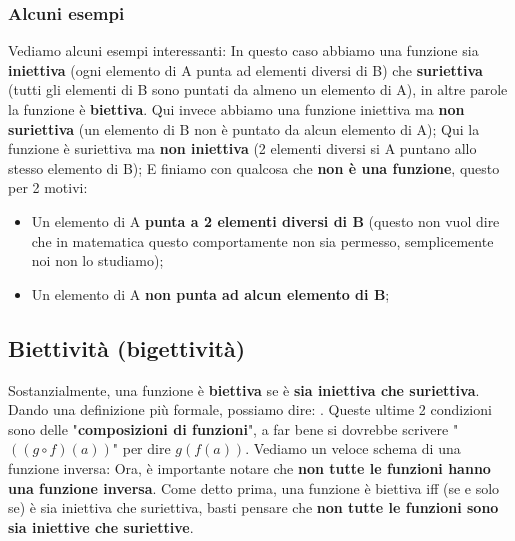 		\subsubsection{Alcuni esempi}
			Vediamo alcuni esempi interessanti:
			In questo caso abbiamo una funzione sia \textbf{iniettiva} (ogni elemento di A punta ad elementi diversi di B) che \textbf{suriettiva} (tutti gli elementi di B sono puntati da almeno un elemento di A), in altre parole la funzione è \textbf{biettiva}.
			Qui invece abbiamo una funzione iniettiva ma \textbf{non suriettiva} (un elemento di B non è puntato da alcun elemento di A);
			Qui la funzione è suriettiva ma \textbf{non iniettiva} (2 elementi diversi si A puntano allo stesso elemento di B);
			E finiamo con qualcosa che \textbf{non è una funzione}, questo per 2 motivi:
			\begin{itemize}
				\item Un elemento di A \textbf{punta a 2 elementi diversi di B} (questo non vuol dire che in matematica questo comportamente non sia permesso, semplicemente noi non lo studiamo);
				\item Un elemento di A \textbf{non punta ad alcun elemento di B};
			\end{itemize}
		
	\subsection{Biettività (bigettività)}
		Sostanzialmente, una funzione è \textbf{biettiva} se è \textbf{sia iniettiva che suriettiva}. Dando una definizione più formale, possiamo dire: . Queste ultime 2 condizioni sono delle "\textbf{composizioni di funzioni}", a far bene si dovrebbe scrivere "$((g \circ f)(a))$" per dire $g(f(a))$. Vediamo un veloce schema di una funzione inversa:		
		Ora, è importante notare che \textbf{non tutte le funzioni hanno una funzione inversa}. Come detto prima, una funzione è biettiva iff (se e solo se) è sia iniettiva che suriettiva, basti pensare che \textbf{non tutte le funzioni sono sia iniettive che suriettive}.
		

